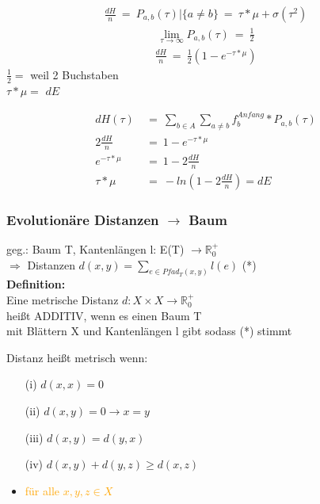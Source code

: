 \begin{align*}
	\frac{dH}{n}~=~P_{a,b} (\tau) | \{a \neq b\}~=~\tau * \mu + \sigma (\tau ^2)
\end{align*}
\begin{align*}
	\lim\limits_{\tau \rightarrow \infty} P_{a,b} (\tau)~=~ \frac{1}{2}
\end{align*}
\begin{align*}
 	\frac{dH}{n}~=~ \frac{1}{2} (1 - e^{-\tau * \mu})
\end{align*} 
$\frac{1}{2} =$ \color{orange} weil 2 Buchstaben\color{black}\\
$\tau * \mu =$ \color{orange} $dE$ \color{black}

\begin{align*}
 	dH(\tau) ~&=~ \sum \limits_{b \in A} \sum \limits_{a \neq b}  f_b^{Anfang} * P_{a,b}(\tau)\\
 	2 \frac{dH}{n} ~&=~ 1 - e^{-\tau * \mu}\\
 	e^{-\tau * \mu} ~&=~ 1 - 2 \frac{dH}{n}\\
 	\tau * \mu ~&=~ -ln (1 - 2 \frac{dH}{n}) = dE
\end{align*} 

\subsubsection{Evolutionäre Distanzen $\rightarrow$ Baum}
geg.: Baum T, Kantenlängen l: E(T) $\rightarrow \mathbb {R}_0^+$\\

\hspace{2cm} $\Rightarrow$ Distanzen $d(x,y) = \sum \limits_{e \in Pfad_T (x,y)} l(e)$ \color{orange}(*)\color{black}\\

\textbf{Definition:}\\
Eine metrische Distanz $d: X \times X \rightarrow \mathbb {R}_0^+$ \\
heißt ADDITIV, wenn es einen Baum T\\
mit Blättern X und Kantenlängen l gibt sodass \color{orange}(*)\color{black} stimmt	

Distanz heißt metrisch wenn:
\begin{itemize}
	\item[(i)] $d(x,x) = 0$
	\item[(ii)] $d(x,y) = 0 \rightarrow x = y$
	\item[(iii)] $d(x,y) = d(y,x)$
	\item[(iv)] $d(x,y) + d(y,z) \geq d(x,z)$
	\item \textcolor{orange}{für alle $x, y, z \in X$}
\end{itemize}

